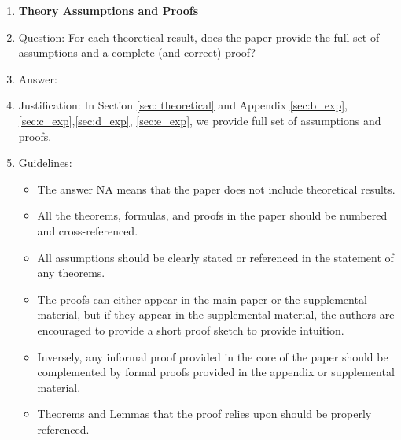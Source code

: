\documentclass{article}
\theoremstyle{plain}
\theoremstyle{definition}
\theoremstyle{remark}
\begin{document}
\begin{enumerate}
\item {\bf Theory Assumptions and Proofs}
    \item[] Question: For each theoretical result, does the paper provide the full set of assumptions and a complete (and correct) proof?
    \item[] Answer: \answerYes{} %
    \item[] Justification: In Section \ref{sec: theoretical} and Appendix \ref{sec:b_exp},\ref{sec:c_exp},\ref{sec:d_exp}, \ref{sec:e_exp}, we provide full set of assumptions and proofs.
    \item[] Guidelines:
    \begin{itemize}
        \item The answer NA means that the paper does not include theoretical results. 
        \item All the theorems, formulas, and proofs in the paper should be numbered and cross-referenced.
        \item All assumptions should be clearly stated or referenced in the statement of any theorems.
        \item The proofs can either appear in the main paper or the supplemental material, but if they appear in the supplemental material, the authors are encouraged to provide a short proof sketch to provide intuition. 
        \item Inversely, any informal proof provided in the core of the paper should be complemented by formal proofs provided in the appendix or supplemental material.
        \item Theorems and Lemmas that the proof relies upon should be properly referenced. 
    \end{itemize}


\end{enumerate}
\end{document}
